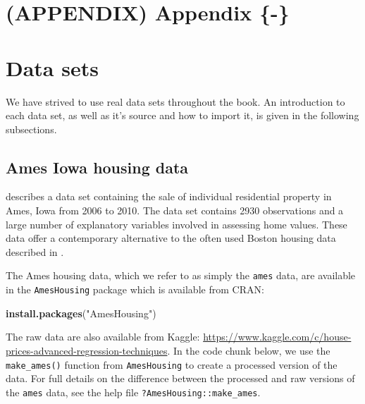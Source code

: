 \documentclass[]{book}
\newenvironment{Shaded}{\begin{snugshade}}{\end{snugshade}}
\newcommand{\KeywordTok}[1]{\textcolor[rgb]{0.13,0.29,0.53}{\textbf{#1}}}
\newcommand{\NormalTok}[1]{#1}
\newcommand{\StringTok}[1]{\textcolor[rgb]{0.31,0.60,0.02}{#1}}
\theoremstyle{definition}
\theoremstyle{definition}
\theoremstyle{definition}
\theoremstyle{remark}
\begin{document}
\hypertarget{appendix-data}{%
\chapter{(APPENDIX) Appendix \{-\}}\label{appendix-data}}

\hypertarget{data-sets}{%
\chapter*{Data sets}\label{data-sets}}

We have strived to use real data sets throughout the book. An
introduction to each data set, as well as it's source and how to import
it, is given in the following subsections.

\hypertarget{ames-iowa-housing-data-1}{%
\section*{Ames Iowa housing data}\label{ames-iowa-housing-data-1}}

\citet{ames-cock-2011} describes a data set containing the sale of
individual residential property in Ames, Iowa from 2006 to 2010. The
data set contains 2930 observations and a large number of explanatory
variables involved in assessing home values. These data offer a
contemporary alternative to the often used Boston housing data described
in \citet{harrison1978hedonic}.

The Ames housing data, which we refer to as simply the \texttt{ames}
data, are available in the \texttt{AmesHousing} package
\citep{pkg-AmesHousing} which is available from CRAN:

\begin{Shaded}
\begin{Highlighting}[]
\KeywordTok{install.packages}\NormalTok{(}\StringTok{"AmesHousing"}\NormalTok{)}
\end{Highlighting}
\end{Shaded}

The raw data are also available from Kaggle:
\url{https://www.kaggle.com/c/house-prices-advanced-regression-techniques}.
In the code chunk below, we use the \texttt{make\_ames()} function from
\texttt{AmesHousing} to create a processed version of the data. For full
details on the difference between the processed and raw versions of the
\texttt{ames} data, see the help file \texttt{?AmesHousing::make\_ames}.
\end{document}
